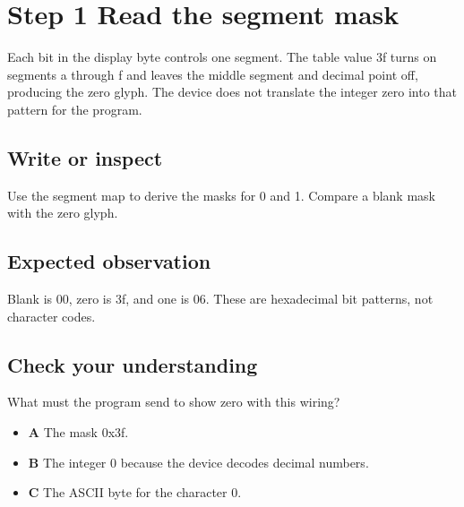 \section{Step 1 Read the segment
  mask}\label{005-seven-segment-counter-s01-step-1-read-the-segment-mask}

Each bit in the display byte controls one segment. The table value 3f
turns on segments a through f and leaves the middle segment and decimal
point off, producing the zero glyph. The device does not translate the
integer zero into that pattern for the program.

\subsection{Write or
  inspect}\label{005-seven-segment-counter-s01-write-or-inspect}

Use the segment map to derive the masks for 0 and 1. Compare a blank
mask with the zero glyph.

\subsection{Expected
  observation}\label{005-seven-segment-counter-s01-expected-observation}

Blank is 00, zero is 3f, and one is 06. These are hexadecimal bit
patterns, not character codes.

\subsection{Check your
  understanding}\label{005-seven-segment-counter-s01-check-your-understanding}

What must the program send to show zero with this wiring?

\begin{itemize}
  \tightlist
  \item
        \textbf{A} The mask 0x3f.
  \item
        \textbf{B} The integer 0 because the device decodes decimal numbers.
  \item
        \textbf{C} The ASCII byte for the character 0.
\end{itemize}
